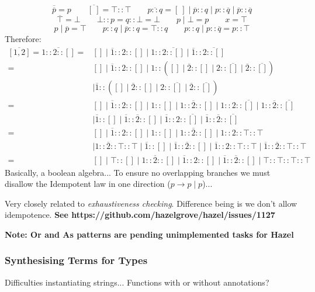 \[\overline{\overline{p}} = p \qquad \overline{[\ ]} = \top::\top \qquad \overline{p :: q} = [\ ] \mid \overline{p}::q \mid p::\overline{q} \mid \overline{p} :: \overline{q}\]
\[\overline{\top} = \bot \qquad \bot :: p = q :: \bot = \bot \qquad p \mid \bot = p \qquad x = \top\]
\[ p \mid \overline{p} = \top \qquad p :: q \mid \overline{p} :: q = \top ::q \qquad p :: q \mid p :: \overline{q} = p::\top\]
Therefore: 
{\tiny
\begin{align*}
\overline{[1,2]} = \overline{1::2::[]} = &[] \mid \overline{1} :: 2::[] \mid 1 :: \overline{2 :: []} \mid \overline{1} :: \overline{2::[]}\\
= &[] \mid \overline{1} :: 2::[] \mid 1 :: ([] \mid \overline{2} :: [] \mid 2 :: \overline{[]} \mid \overline{2} :: \overline{[]}) \\
&\mid \overline{1} :: ([] \mid \overline{2} :: [] \mid 2 :: \overline{[]} \mid \overline{2} :: \overline{[]})\\
= &[] \mid \overline{1} :: 2::[] \mid 1 :: [] \mid 1 :: \overline{2} :: [] \mid 1::2 :: \overline{[]} \mid 1::\overline{2} :: \overline{[]}\\
&\mid \overline{1} :: [] \mid \overline{1} ::\overline{2} :: [] \mid \overline{1} ::2 :: \overline{[]} \mid \overline{1} ::\overline{2} :: \overline{[]}\\
= &[] \mid \overline{1} :: 2::[] \mid 1 :: [] \mid 1 :: \overline{2} :: [] \mid 1::2 :: \top::\top\\
&\mid 1::\overline{2} :: \top::\top \mid \overline{1} :: [] \mid \overline{1} ::\overline{2} :: [] \mid \overline{1} ::2 :: \top::\top \mid \overline{1} ::\overline{2} :: \top :: \top\\
= &[] \mid \top::[] \mid 1::\overline{2}::[] \mid \overline{1}::2::[] \mid \overline{1}::\overline{2}::[] \mid \top::\top::\top::\top
\end{align*}
}
Basically, a boolean algebra... To ensure no overlapping branches we must disallow the Idempotent law in one direction ($p \to p \mid p$)...

Very closely related to \textit{exhaustiveness checking}. Difference being is we don't allow idempotence. \textbf{See {https://github.com/hazelgrove/hazel/issues/1127}}

\textbf{Note: Or and As patterns are pending unimplemented tasks for Hazel}

\subsubsection{Synthesising Terms for Types}
Difficulties instantiating strings...
Functions with or without annotations?

